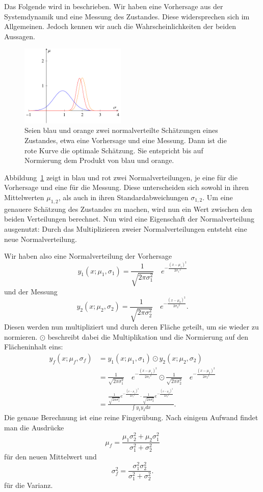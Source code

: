 Das Folgende wird in \cite{erdbeben:aragher_understanding_2012} beschrieben.
Wir haben eine Vorhersage aus der Systemdynamik und eine Messung des Zustandes.
Diese widersprechen sich im Allgemeinen. 
Jedoch kennen wir auch die Wahrscheinlichkeiten der beiden Aussagen. 

\begin{figure}
 \begin{center}
 \includegraphics[width=5cm]{papers/erdbeben/Gausskurve3.pdf}
 \caption{
    Seien blau und orange zwei normalverteilte Schätzungen eines Zustandes, etwa eine Vorhersage und eine Messung.
    Dann ist die rote Kurve die optimale Schätzung.
    Sie entspricht bis auf Normierung dem Produkt von blau und orange.}
 \label{erdbeben:Gauss3}
 \end{center}
\end{figure}
Abbildung~\ref{erdbeben:Gauss3} zeigt in blau und rot zwei Normalverteilungen,
je eine für die Vorhersage und eine für die Messung.
Diese unterscheiden sich sowohl in ihren Mittelwerten $\mu_{1,2}$, als auch in ihren Standardabweichungen $\sigma_{1,2}$.
Um eine genauere Schätzung des Zustandes zu machen, wird nun ein Wert zwischen den beiden Verteilungen berechnet. 
Nun wird eine Eigenschaft der Normalverteilung ausgenutzt:
Durch das Multiplizieren zweier Normalverteilungen entsteht eine neue Normalverteilung. 

Wir haben also eine Normalverteilung der Vorhersage
\[ 
{y_1}(x;{\mu_1},{\sigma_1})=\frac{1}{\sqrt{2\pi\sigma_1^2}}\quad e^{-\frac{(x-{\mu_1})^2}{2{\sigma_1}^2}} 
\]
und der Messung
\[ 
{y_2}(x;{\mu_2},{\sigma_2})=\frac{1}{\sqrt{2\pi\sigma_2^2}}\quad e^{-\frac{(x-{\mu_2})^2}{2{\sigma_2}^2}}.
\]
Diesen werden nun multipliziert und durch deren Fläche geteilt,
um sie wieder zu normieren.
$\odot$ beschreibt dabei die Multiplikation und die Normierung auf den Flächeninhalt eins:
\begin{align*}
	{y_f}(x; {\mu_f}, {\sigma_f}) 
	&=
	 {y_1}(x;{ \mu_1},{ \sigma_1}) \odot {y_2}(x; {\mu_2}, {\sigma_2})
	\\
	&=
	\frac{1}{\sqrt{2\pi\sigma_1^2}}\quad e^{-\frac{(x-{\mu_1})^2}{2{\sigma_1}^2}} \odot \frac{1}{\sqrt{2\pi\sigma_2^2}}\quad e^{-\frac{(x-{\mu_2})^2}{2{\sigma_2}^2}}
	\\
	&=
	\frac{ \frac{1}{\sqrt{2\pi\sigma_1^2}}e^{-\frac{(x-{\mu_1})^2}{2{\sigma_1}^2}} \cdot \frac{1}{\sqrt{2\pi\sigma_2^2}}e^{-\frac{(x-{\mu_2})^2}{2{\sigma_2}^2}}}{\int {y_1} {y_2} dx}.
\end{align*}
Die genaue Berechnung ist eine reine Fingerübung.
Nach einigem Aufwand findet man die Ausdrücke 
\[ \mu_f = \frac{\mu_1\sigma_2^2 + \mu_2 \sigma_1^2}{\sigma_1^2 + \sigma_2^2} \]
für den neuen Mittelwert und
\[
\sigma_f^2 = \frac{\sigma_1^2 \sigma_2^2}{\sigma_1^2 + \sigma_2^2}.
\]
für die Varianz.

